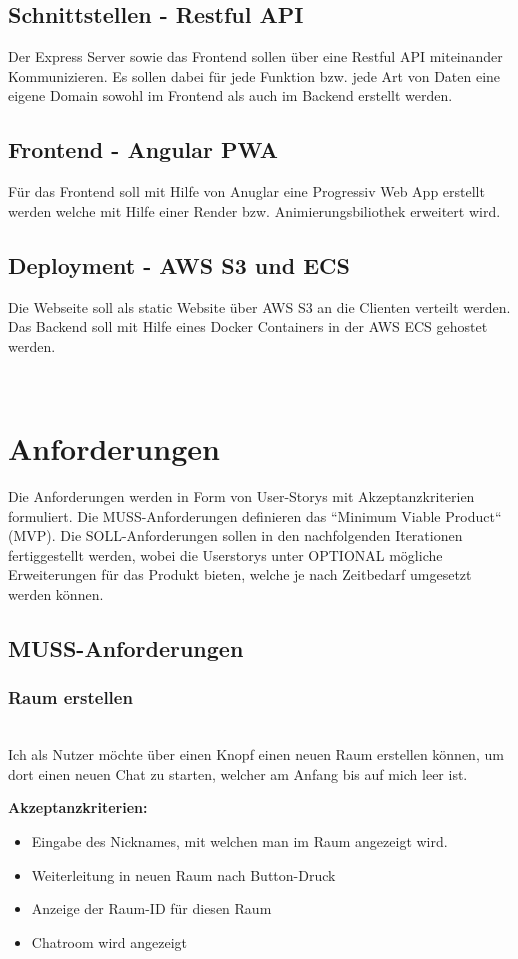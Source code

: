 \documentclass[conference]{IEEEtran}
\begin{document}
	\subsection{Schnittstellen - Restful API}
	Der Express Server sowie das Frontend sollen über eine Restful API miteinander Kommunizieren. Es sollen dabei für jede Funktion bzw. jede Art von Daten eine eigene Domain sowohl im Frontend als auch im Backend erstellt werden.
	
	\subsection{Frontend - Angular PWA}
	Für das Frontend soll mit Hilfe von Anuglar eine Progressiv Web App erstellt werden welche mit Hilfe einer Render bzw. Animierungsbiliothek erweitert wird.

	\subsection{Deployment - AWS S3 und ECS}
	Die Webseite soll als static Website über AWS S3 an die Clienten verteilt werden. Das Backend soll mit Hilfe eines Docker Containers in der AWS ECS gehostet werden.

	\ \\
	\section{Anforderungen}
	Die Anforderungen werden in Form von User-Storys mit Akzeptanzkriterien formuliert. Die MUSS-Anforderungen definieren das ``Minimum Viable Product`` (MVP). Die SOLL-Anforderungen sollen in den nachfolgenden Iterationen fertiggestellt werden, wobei die Userstorys unter OPTIONAL mögliche Erweiterungen für das Produkt bieten, welche je nach Zeitbedarf umgesetzt werden können.
	\subsection{MUSS-Anforderungen}

	\subsubsection{Raum erstellen}
	\ \\
	Ich als Nutzer möchte über einen Knopf einen neuen Raum erstellen können, um dort einen neuen Chat zu starten, welcher am Anfang bis auf mich leer ist.
	
	\textbf{Akzeptanzkriterien:}
	\begin{itemize}
		\item Eingabe des Nicknames, mit welchen man im Raum angezeigt wird.
		\item Weiterleitung in neuen Raum nach Button-Druck
		\item Anzeige der Raum-ID für diesen Raum
		\item Chatroom wird angezeigt
	\end{itemize}
	\ \\
\end{document}
